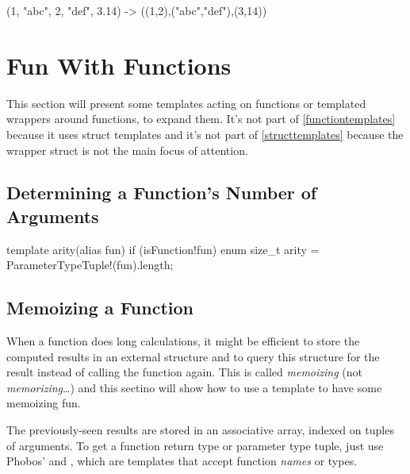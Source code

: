 \begin{dcode}
(1, "abc", 2, "def", 3.14)
->
((1,2),("abc","def"),(3,14))
\end{dcode}

\section{Fun With Functions}\label{funwithfunctions}

This section will present some templates acting on functions or templated wrappers around functions, to expand them. It's not part of \autoref{functiontemplates} because it uses struct templates and it's not part of \autoref{structtemplates} because the wrapper struct is not the main focus of attention.

\subsection{Determining a Function's Number of Arguments}\label{arity}


\begin{dcode}
template arity(alias fun) 
if (isFunction!fun)
{
    enum size_t arity = ParameterTypeTuple!(fun).length;
}
\end{dcode}

\subsection{Memoizing a Function} \label{memoizing}

When a function does long calculations, it might be efficient to store the computed results in an external structure and to query this structure for the result instead of calling the function again. This is called \emph{memoizing} (not \emph{memorizing}\ldots) and this sectino will show how to use a template to have some memoizing fun.

The previously-seen results are stored in an associative array, indexed on tuples of arguments. To get a function return type or parameter type tuple, just use Phobos'  and , which are templates that accept function \emph{names} or types.


